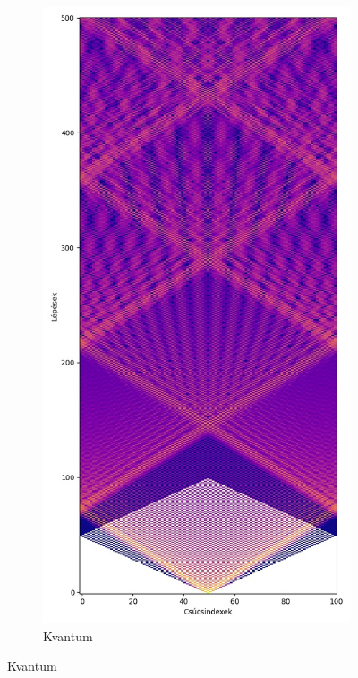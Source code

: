 \begin{figure}[H]
\begin{subfigure}{.45\linewidth}
  \end{subfigure}
  \begin{subfigure}{.45\linewidth}
    \centering
    \includegraphics[width=\linewidth]{./figures/quantum/quantum_simulation_long.jpg}
    \caption{Kvantum}
  \end{subfigure}
\end{figure}

